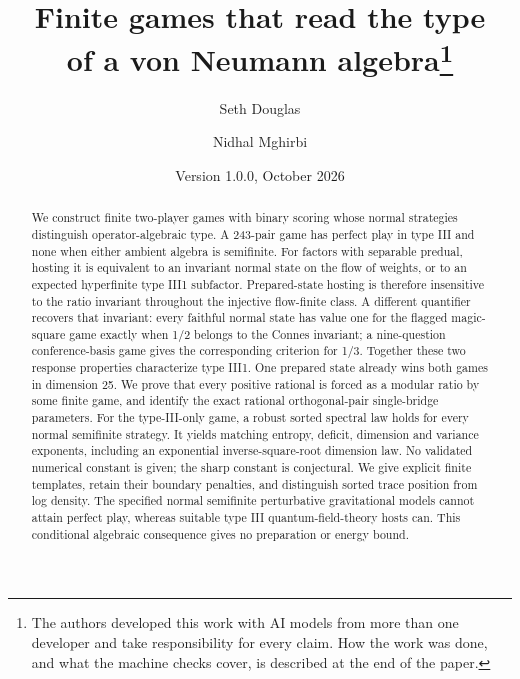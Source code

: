 \documentclass[11pt]{article}
\title{Finite games that read the type\\of a von Neumann algebra\thanks{The authors developed this work with AI models from more than one developer and take responsibility for every claim. How the work was done, and what the machine checks cover, is described at the end of the paper.}}
\author{Seth Douglas \and Nidhal Mghirbi}
\date{Version 1.0.0, October 2026}
\theoremstyle{definition}
\begin{document}
\maketitle
\begin{abstract}
We construct finite two-player games with binary scoring whose normal strategies distinguish operator-algebraic type. A 243-pair game has perfect play in type III and none when either ambient algebra is semifinite. For factors with separable predual, hosting it is equivalent to an invariant normal state on the flow of weights, or to an expected hyperfinite type III1 subfactor. Prepared-state hosting is therefore insensitive to the ratio invariant throughout the injective flow-finite class. A different quantifier recovers that invariant: every faithful normal state has value one for the flagged magic-square game exactly when 1/2 belongs to the Connes invariant; a nine-question conference-basis game gives the corresponding criterion for 1/3. Together these two response properties characterize type III1. One prepared state already wins both games in dimension 25. We prove that every positive rational is forced as a modular ratio by some finite game, and identify the exact rational orthogonal-pair single-bridge parameters. For the type-III-only game, a robust sorted spectral law holds for every normal semifinite strategy. It yields matching entropy, deficit, dimension and variance exponents, including an exponential inverse-square-root dimension law. No validated numerical constant is given; the sharp constant is conjectural. We give explicit finite templates, retain their boundary penalties, and distinguish sorted trace position from log density. The specified normal semifinite perturbative gravitational models cannot attain perfect play, whereas suitable type III quantum-field-theory hosts can. This conditional algebraic consequence gives no preparation or energy bound.
\end{abstract}










\end{document}

